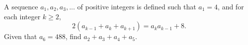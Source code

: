 A sequence $a_1,a_2,a_3, ...$ of positive integers is defined such that $a_1 = 4$, and for each integer $k \ge 2$, \[2(a_{k-1} +a_k +a_{k+1}) = a_ka_{k-1} +8.\]Given that $a_6 = 488$, find $a_2 +a_3 +a_4 +a_5$.
